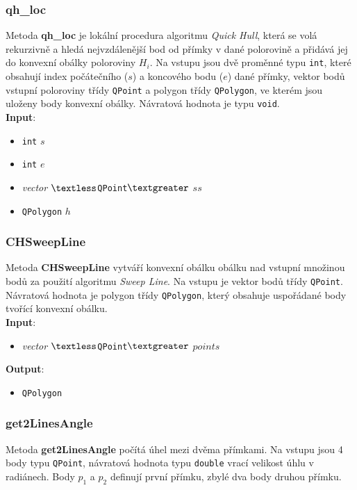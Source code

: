 \documentclass[a4paper, 12pt]{article}
\begin{document}
\subsubsection*{qh\_loc}
Metoda \textbf{qh\_loc} je lokální procedura algoritmu \textit{Quick Hull}, která se volá rekurzivně a hledá nejvzdálenější bod od přímky v dané polorovině a přidává jej do konvexní obálky poloroviny $H_i$. Na vstupu jsou dvě proměnné typu \texttt{int}, které obsahují index počátečního ($s$) a koncového bodu ($e$) dané přímky, vektor bodů vstupní poloroviny třídy \texttt{QPoint} a polygon třídy \texttt{QPolygon}, ve kterém jsou uloženy body konvexní obálky. Návratová hodnota je typu \texttt{void}.\\

\textbf{Input}:
\begin{itemize}
\item \texttt{int} $s$
\item \texttt{int} $e$
\item \textsl{vector} $\textless$\texttt{QPoint}$\textgreater$ $ss$
\item \texttt{QPolygon} $h$
\end{itemize}

\subsubsection*{CHSweepLine}
Metoda \textbf{CHSweepLine} vytváří konvexní obálku obálku nad vstupní množinou bodů za použití algoritmu \textit{Sweep Line}. Na vstupu je vektor bodů třídy \texttt{QPoint}. Návratová hodnota je polygon třídy \texttt{QPolygon}, který obsahuje uspořádané body tvořící konvexní obálku.\\

\textbf{Input}:
\begin{itemize}
\item \textsl{vector} $\textless$\texttt{QPoint}$\textgreater$ $points$
\end{itemize}

\textbf{Output}:
\begin{itemize}
\item \texttt{QPolygon}
\end{itemize}

\subsubsection*{get2LinesAngle}
Metoda \textbf{get2LinesAngle} počítá úhel mezi dvěma přímkami. Na vstupu jsou 4 body typu \texttt{QPoint}, návratová hodnota typu \texttt{double} vrací velikost úhlu v radiánech. Body $p_1$ a $p_2$ definují první přímku, zbylé dva body druhou přímku.\\
\end{document}
